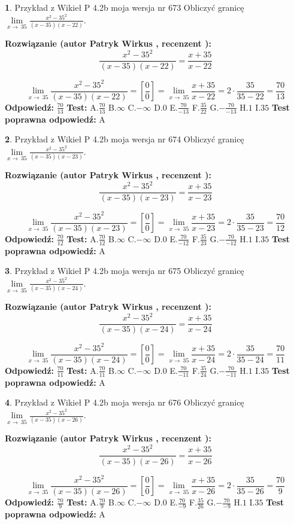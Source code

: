 \documentclass[12pt, a4paper]{article}
\theoremstyle{definition} %
\newtheorem{zad}{}
\newcommand{\zadStart}[1]{\begin{zad}#1\newline}
\newcommand{\zadStop}{\end{zad}}
\newcommand{\rozwStart}[2]{\noindent \textbf{Rozwiązanie (autor #1 , recenzent #2): }\newline}
\newcommand{\rozwStop}{\newline}
\newcommand{\odpStart}{\noindent \textbf{Odpowiedź:}\newline}
\newcommand{\odpStop}{\newline}
\newcommand{\testStart}{\noindent \textbf{Test:}\newline}
\newcommand{\testStop}{\newline}
\newcommand{\kluczStart}{\noindent \textbf{Test poprawna odpowiedź:}\newline}
\newcommand{\kluczStop}{\newline}
\begin{document}
\zadStart{Przykład z Wikieł P 4.2b moja wersja nr 673}
Obliczyć granicę $\lim\limits_{x\to\ 35}\frac{x^{2}-35^{2}}{(x-35)(x-22)}$.
\zadStop
\rozwStart{Patryk Wirkus}{}
$$\frac{x^{2}-35^{2}}{(x-35)(x-22)}=\frac{x+35}{x-22}$$

$$\lim\limits_{x\to\ 35}\frac{x^{2}-35^{2}}{(x-35)(x-22)}=[\frac{0}{0}]=\lim\limits_{x\to\ 35}\frac{x+35}{x-22}=2 \cdot \frac{35}{35-22} = \frac{70}{13}$$
\rozwStop
\odpStart
$\frac{70}{13}$
\odpStop
\testStart
A.$\frac{70}{13}$
B.$\infty$
C.$-\infty$
D.$0$
E.$\frac{70}{-13}$
F.$\frac{35}{22}$
G.$-\frac{70}{-13}$
H.$1$
I.$35$
\testStop
\kluczStart
A
\kluczStop



\zadStart{Przykład z Wikieł P 4.2b moja wersja nr 674}
Obliczyć granicę $\lim\limits_{x\to\ 35}\frac{x^{2}-35^{2}}{(x-35)(x-23)}$.
\zadStop
\rozwStart{Patryk Wirkus}{}
$$\frac{x^{2}-35^{2}}{(x-35)(x-23)}=\frac{x+35}{x-23}$$

$$\lim\limits_{x\to\ 35}\frac{x^{2}-35^{2}}{(x-35)(x-23)}=[\frac{0}{0}]=\lim\limits_{x\to\ 35}\frac{x+35}{x-23}=2 \cdot \frac{35}{35-23} = \frac{70}{12}$$
\rozwStop
\odpStart
$\frac{70}{12}$
\odpStop
\testStart
A.$\frac{70}{12}$
B.$\infty$
C.$-\infty$
D.$0$
E.$\frac{70}{-12}$
F.$\frac{35}{23}$
G.$-\frac{70}{-12}$
H.$1$
I.$35$
\testStop
\kluczStart
A
\kluczStop



\zadStart{Przykład z Wikieł P 4.2b moja wersja nr 675}
Obliczyć granicę $\lim\limits_{x\to\ 35}\frac{x^{2}-35^{2}}{(x-35)(x-24)}$.
\zadStop
\rozwStart{Patryk Wirkus}{}
$$\frac{x^{2}-35^{2}}{(x-35)(x-24)}=\frac{x+35}{x-24}$$

$$\lim\limits_{x\to\ 35}\frac{x^{2}-35^{2}}{(x-35)(x-24)}=[\frac{0}{0}]=\lim\limits_{x\to\ 35}\frac{x+35}{x-24}=2 \cdot \frac{35}{35-24} = \frac{70}{11}$$
\rozwStop
\odpStart
$\frac{70}{11}$
\odpStop
\testStart
A.$\frac{70}{11}$
B.$\infty$
C.$-\infty$
D.$0$
E.$\frac{70}{-11}$
F.$\frac{35}{24}$
G.$-\frac{70}{-11}$
H.$1$
I.$35$
\testStop
\kluczStart
A
\kluczStop



\zadStart{Przykład z Wikieł P 4.2b moja wersja nr 676}
Obliczyć granicę $\lim\limits_{x\to\ 35}\frac{x^{2}-35^{2}}{(x-35)(x-26)}$.
\zadStop
\rozwStart{Patryk Wirkus}{}
$$\frac{x^{2}-35^{2}}{(x-35)(x-26)}=\frac{x+35}{x-26}$$

$$\lim\limits_{x\to\ 35}\frac{x^{2}-35^{2}}{(x-35)(x-26)}=[\frac{0}{0}]=\lim\limits_{x\to\ 35}\frac{x+35}{x-26}=2 \cdot \frac{35}{35-26} = \frac{70}{9}$$
\rozwStop
\odpStart
$\frac{70}{9}$
\odpStop
\testStart
A.$\frac{70}{9}$
B.$\infty$
C.$-\infty$
D.$0$
E.$\frac{70}{-9}$
F.$\frac{35}{26}$
G.$-\frac{70}{-9}$
H.$1$
I.$35$
\testStop
\kluczStart
A
\kluczStop
\end{document}
